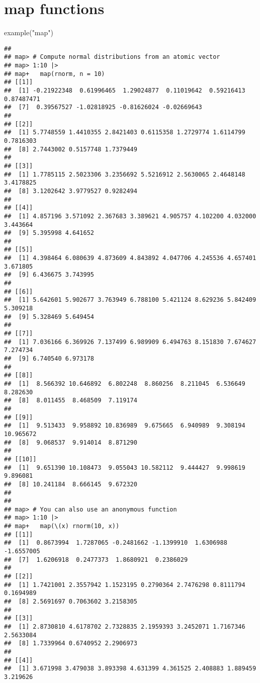 \documentclass[
]{book}
\newenvironment{Shaded}{\begin{snugshade}}{\end{snugshade}}
\newcommand{\FunctionTok}[1]{\textcolor[rgb]{0.00,0.00,0.00}{#1}}
\newcommand{\NormalTok}[1]{#1}
\newcommand{\StringTok}[1]{\textcolor[rgb]{0.31,0.60,0.02}{#1}}
\begin{document}
\hypertarget{map-functions}{%
\section{map functions}\label{map-functions}}

\begin{Shaded}
\begin{Highlighting}[]
\FunctionTok{example}\NormalTok{(}\StringTok{"map"}\NormalTok{)}
\end{Highlighting}
\end{Shaded}

\begin{verbatim}
## 
## map> # Compute normal distributions from an atomic vector
## map> 1:10 |>
## map+   map(rnorm, n = 10)
## [[1]]
##  [1] -0.21922348  0.61996465  1.29024877  0.11019642  0.59216413  0.87487471
##  [7]  0.39567527 -1.02818925 -0.81626024 -0.02669643
## 
## [[2]]
##  [1] 5.7748559 1.4410355 2.8421403 0.6115358 1.2729774 1.6114799 0.7816303
##  [8] 2.7443002 0.5157748 1.7379449
## 
## [[3]]
##  [1] 1.7785115 2.5023306 3.2356692 5.5216912 2.5630065 2.4648148 3.4178825
##  [8] 3.1202642 3.9779527 0.9282494
## 
## [[4]]
##  [1] 4.857196 3.571092 2.367683 3.389621 4.905757 4.102200 4.032000 3.443664
##  [9] 5.395998 4.641652
## 
## [[5]]
##  [1] 4.398464 6.080639 4.873609 4.843892 4.047706 4.245536 4.657401 3.671805
##  [9] 6.436675 3.743995
## 
## [[6]]
##  [1] 5.642601 5.902677 3.763949 6.788100 5.421124 8.629236 5.842409 5.309218
##  [9] 5.328469 5.649454
## 
## [[7]]
##  [1] 7.036166 6.369926 7.137499 6.989909 6.494763 8.151830 7.674627 7.274734
##  [9] 6.740540 6.973178
## 
## [[8]]
##  [1]  8.566392 10.646892  6.802248  8.860256  8.211045  6.536649  8.282630
##  [8]  8.011455  8.468509  7.119174
## 
## [[9]]
##  [1]  9.513433  9.958892 10.836989  9.675665  6.940989  9.308194 10.965672
##  [8]  9.068537  9.914014  8.871290
## 
## [[10]]
##  [1]  9.651390 10.108473  9.055043 10.582112  9.444427  9.998619  9.896081
##  [8] 10.241184  8.666145  9.672320
## 
## 
## map> # You can also use an anonymous function
## map> 1:10 |>
## map+   map(\(x) rnorm(10, x))
## [[1]]
##  [1]  0.8673994  1.7287065 -0.2481662 -1.1399910  1.6306988 -1.6557005
##  [7]  1.6206918  0.2477373  1.8680921  0.2386029
## 
## [[2]]
##  [1] 1.7421001 2.3557942 1.1523195 0.2790364 2.7476298 0.8111794 0.1694989
##  [8] 2.5691697 0.7063602 3.2158305
## 
## [[3]]
##  [1] 2.8730810 4.6178702 2.7328835 2.1959393 3.2452071 1.7167346 2.5633084
##  [8] 1.7339964 0.6740952 2.2906973
## 
## [[4]]
##  [1] 3.671998 3.479038 3.893398 4.631399 4.361525 2.408883 1.889459 3.219626

\end{verbatim}
\end{document}
